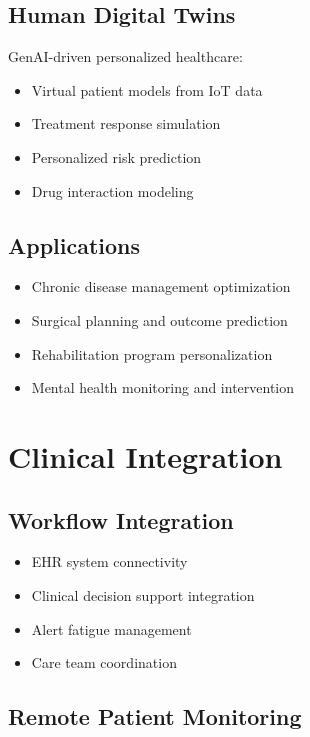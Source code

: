 \documentclass[12pt,a4paper]{article}
\begin{document}
\subsection{Human Digital Twins}

GenAI-driven personalized healthcare:
\begin{itemize}
    \item Virtual patient models from IoT data
    \item Treatment response simulation
    \item Personalized risk prediction
    \item Drug interaction modeling
\end{itemize}

\subsection{Applications}

\begin{itemize}
    \item Chronic disease management optimization
    \item Surgical planning and outcome prediction
    \item Rehabilitation program personalization
    \item Mental health monitoring and intervention
\end{itemize}

\section{Clinical Integration}

\subsection{Workflow Integration}

\begin{itemize}
    \item EHR system connectivity
    \item Clinical decision support integration
    \item Alert fatigue management
    \item Care team coordination
\end{itemize}

\subsection{Remote Patient Monitoring}
\end{document}
